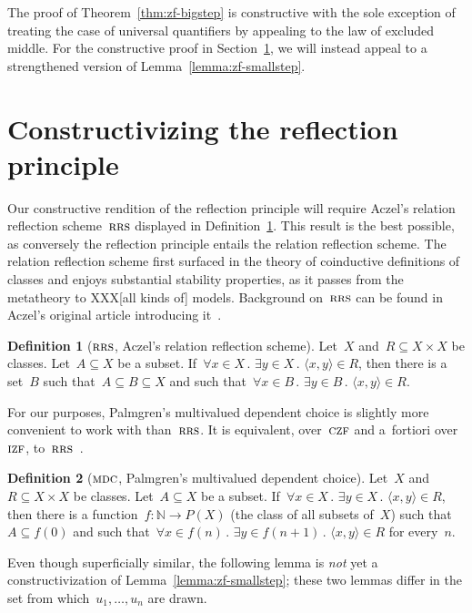 \documentclass[oneside,reqno]{amsart}
\theoremstyle{definition}
\newtheorem{defn}{Definition}[section]
\theoremstyle{plain}
\theoremstyle{remark}
\newcommand{\NN}{\mathbb{N}}
\renewcommand{\_}{\mathpunct{.}\,}
\newcommand{\?}{\,{:}\,}
\newcommand{\IZF}{\textsc{izf}}
\newcommand{\CZF}{\textsc{czf}}
\newcommand{\RRS}{\textsc{rrs}}
\newcommand{\MDC}{\textsc{mdc}}
\begin{document}
The proof of Theorem~\ref{thm:zf-bigstep} is constructive with the sole
exception of treating the case of universal quantifiers by appealing to the law
of excluded middle. For the constructive proof in
Section~\ref{sect:constructive-proof}, we will instead appeal to a strengthened
version of Lemma~\ref{lemma:zf-smallstep}.


\section{Constructivizing the reflection principle}
\label{sect:constructive-proof}

Our constructive rendition of the reflection principle will require Aczel's
relation reflection scheme~$\RRS$ displayed in Definition~\ref{defn:rrs}. This
result is the best possible, as conversely the reflection principle entails the
relation reflection scheme. The relation reflection scheme first surfaced in
the theory of coinductive definitions of classes and enjoys substantial
stability properties, as it passes from the metatheory to XXX[all kinds of]
models. Background on~$\RRS$ can be found in Aczel's original article
introducing it~\cite{aczel:rrs}.

\begin{defn}[$\RRS$, Aczel's relation reflection scheme]\label{defn:rrs}
Let~$X$ and~$R \subseteq X \times X$ be classes. Let~$A \subseteq X$ be a
subset. If~$\forall x \in X\_ \exists y \in X\_ \langle x,y \rangle \in R$,
then there is a set~$B$ such that~$A \subseteq B \subseteq X$ and such
that~$\forall x \in B\_ \exists y \in B\_ \langle x,y \rangle \in R$.
\end{defn}

For our purposes, Palmgren's multivalued dependent choice is slightly more
convenient to work with than~$\RRS$. It is equivalent, over~$\CZF$ and
a~fortiori over~$\IZF$, to~$\RRS$~\cite{palmgren:mdc}.

\begin{defn}[$\MDC$, Palmgren's multivalued dependent choice]
Let~$X$ and~$R \subseteq X \times X$ be classes. Let~$A \subseteq X$ be a
subset. If~$\forall x \in X\_ \exists y \in X\_ \langle x,y \rangle \in R$,
then there is a function~$f : \NN \to P(X)$ (the class of all subsets of~$X$)
such that~$A \subseteq f(0)$ and such that~$\forall x \in f(n)\_ \exists y \in
f(n+1)\_ \langle x,y \rangle \in R$ for every~$n$.\end{defn}

Even though superficially similar, the following lemma is \emph{not} yet a
constructivization of Lemma~\ref{lemma:zf-smallstep}; these two lemmas differ
in the set from which~$u_1,\ldots,u_n$ are drawn.
\end{document}
